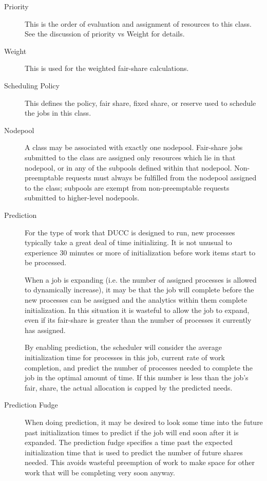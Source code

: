     \begin{description}
        \item[Priority] This is the order of evaluation and assignment of resources to this class. See
          the discussion of priority vs Weight for details. 

        \item[Weight] This is used for the weighted fair-share calculations. 

        \item[Scheduling Policy] This defines the policy, fair share, fixed share, or reserve used to
          schedule the jobs in this class.

        \item[Nodepool] A class may be associated with exactly one nodepool. Fair-share jobs submitted to the class
          are assigned only resources which lie in that nodepool, or in any of the subpools defined
          within that nodepool.  Non-preemptable requests must always be fulfilled from the nodepool
          assigned to the class; subpools are exempt from non-preemptable requests submitted to higher-level
          nodepools.

        \item[Prediction] For the type of work that DUCC is designed to run, new processes typically take
          a great deal of time initializing. It is not unusual to experience 30 minutes or more of
          initialization before work items start to be processed.

          When a job is expanding (i.e. the number of assigned processes is allowed to dynamically 
          increase), it may be that the job will complete before the new processes can be assigned and 
          the analytics within them complete initialization. In this situation it is wasteful to allow the 
          job to expand, even if its fair-share is greater than the number of processes it currently has 
          assigned. 
          
          By enabling prediction, the scheduler will consider the average initialization time for processes 
          in this job, current rate of work completion, and predict the number of processes needed to 
          complete the job in the optimal amount of time. If this number is less than the job's fair, share, 
          the actual allocation is capped by the predicted needs. 
          
        \item[Prediction Fudge] When doing prediction, it may be desired to look some time into the
          future past initialization times to predict if the job will end soon after it is expanded. 
          The prediction fudge specifies a time past the expected initialization time that is used to
          predict the number of future shares needed.  This avoids wasteful preemption of work to make space
          for other work that will be completing very soon anyway.


\end{description}
